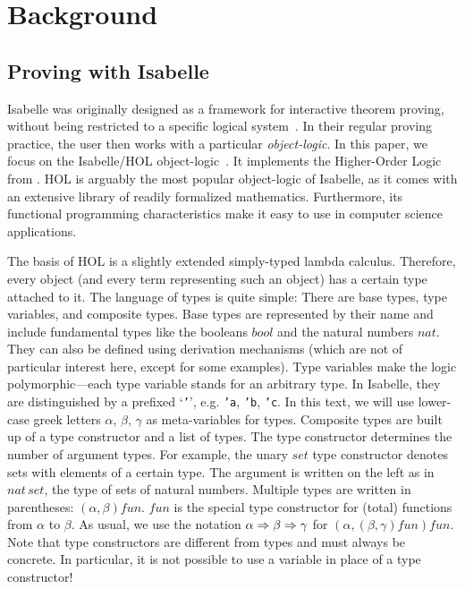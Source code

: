 \section{Background}\label{sec:background}

\subsection{Proving with Isabelle}\label{subsec:isabelle}

Isabelle was originally designed as a framework for interactive theorem
proving, without being restricted to a specific logical system~\cite{paulson90}.
In their regular proving practice, the user then works with a particular
\emph{object-logic}.
In this paper, we focus on the Isabelle/HOL object-logic~\cite{npw02}.
It implements the Higher-Order Logic from \cite{gordon93}. %
HOL is arguably the most popular object-logic of Isabelle, as it comes with
an extensive library of readily formalized mathematics.
Furthermore, its functional programming characteristics make it easy to use
in computer science applications. %

The basis of HOL is a slightly extended simply-typed lambda calculus.
Therefore, every object (and every term representing such an object) has a
certain type attached to it.
The language of types is quite simple:
There are base types, type variables, and composite types.
Base types are represented by their name and include fundamental types like
the booleans $\mathit{bool}$ and the natural numbers $\mathit{nat}$.
They can also be defined using derivation mechanisms (which are not of
particular interest here, except for some examples).
Type variables make the logic polymorphic---each type variable stands for an
arbitrary type.
In Isabelle, they are distinguished by a prefixed `\texttt{'}', e.g.
\texttt{'a}, \texttt{'b}, \texttt{'c}.
In this text, we will use lower-case greek letters $\alpha$, $\beta$, $\gamma$
as meta-variables for types.
Composite types are built up of a type constructor and a list of types.
The type constructor determines the number of argument types.
For example, the unary $\mathit{set}$ type constructor denotes sets with
elements of a certain type.
The argument is written on the left as in $\mathit{nat\,set}$, the type of
sets of natural numbers.
Multiple types are written in parentheses: $(\alpha, \beta) \mathit{fun}$.
$\mathit{fun}$ is the special type constructor for (total) functions from
$\alpha$ to $\beta$.
As usual, we use the notation $\alpha \Rightarrow \beta \Rightarrow \gamma$ for
$(\alpha, (\beta, \gamma) \mathit{fun}) \mathit{fun}$.
Note that type constructors are different from types and must always be
concrete.
In particular, it is not possible to use a variable in place of a type
constructor!

